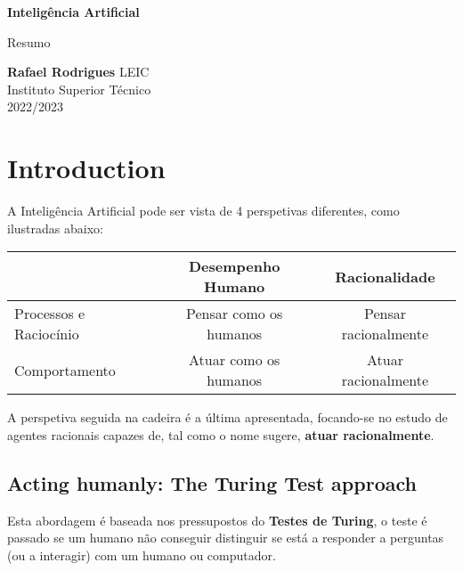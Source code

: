\documentclass[11pt]{article}
\begin{document}
\begin{titlepage}
    \begin{center}
        \vspace*{1cm}

        \textbf{\LARGE Inteligência Artificial}
        \vspace{0.5cm}

        \Large Resumo
        \vspace{1.5cm}

        \textbf{Rafael Rodrigues}
        \vfill
        LEIC \\
        Instituto Superior Técnico \\
        2022/2023
    \end{center}
\end{titlepage}

\tableofcontents

\newpage
\section{Introduction}

A Inteligência Artificial pode ser vista de 4 perspetivas diferentes, como ilustradas abaixo:

\begin{tabular}[t]{ | l | c | c | }
    \hline
        & Desempenho Humano & Racionalidade \\\hline
    Processos e Raciocínio & Pensar como os humanos & Pensar racionalmente \\\hline
    Comportamento & Atuar como os humanos & Atuar racionalmente \\\hline
\end{tabular}
\vspace{10pt}

A perspetiva seguida na cadeira é a última apresentada, focando-se no estudo de agentes racionais capazes de, tal como o nome sugere, \textbf{atuar racionalmente}.

\subsection{Acting humanly: The Turing Test approach}

Esta abordagem é baseada nos pressupostos do \textbf{Testes de Turing}, o teste é passado se um humano não conseguir distinguir se está a responder a perguntas (ou a interagir) com um humano ou computador. \vspace{10pt}
\end{document}

